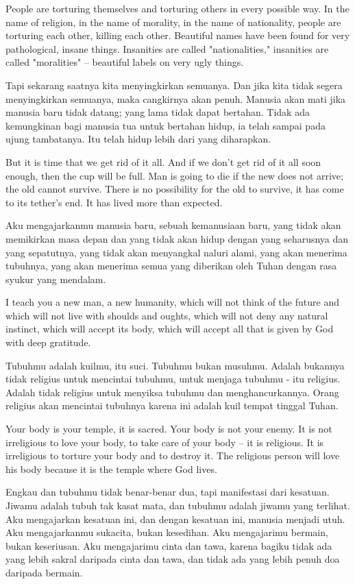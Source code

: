 \english
People are torturing themselves and torturing others in every possible way. In the name of religion, in the name of morality, in the name of nationality, people are torturing each other, killing each other. Beautiful names have been found for very pathological, insane things. Insanities are called "nationalities," insanities are called "moralities" -- beautiful labels on very ugly things.

\bahasa
Tapi sekarang saatnya kita menyingkirkan semuanya. Dan jika kita tidak segera menyingkirkan semuanya, maka cangkirnya akan penuh. Manusia akan mati jika manusia baru tidak datang; yang lama tidak dapat bertahan. Tidak ada kemungkinan bagi manusia tua untuk bertahan hidup, ia telah sampai pada ujung tambatanya. Itu telah hidup lebih dari yang diharapkan.

\english
But it is time that we get rid of it all. And if we don't get rid of it all soon enough, then the cup will be full. Man is going to die if the new does not arrive; the old cannot survive. There is no possibility for the old to survive, it has come to its tether's end. It has lived more than expected.

\bahasa
Aku mengajarkanmu manusia baru, sebuah kemanusiaan baru, yang tidak akan memikirkan masa depan dan yang tidak akan hidup dengan yang seharusnya dan yang sepatutnya, yang tidak akan menyangkal naluri alami, yang akan menerima tubuhnya, yang akan menerima semua yang diberikan oleh Tuhan dengan rasa syukur yang mendalam.

\english
I teach you a new man, a new humanity, which will not think of the future and which will not live with shoulds and oughts, which will not deny any natural instinct, which will accept its body, which will accept all that is given by God with deep gratitude.

\bahasa
Tubuhmu adalah kuilmu, itu suci. Tubuhmu bukan musuhmu. Adalah bukannya tidak religius untuk mencintai tubuhmu, untuk menjaga tubuhmu - itu religius. Adalah tidak religius untuk menyiksa tubuhmu dan menghancurkannya. Orang religius akan mencintai tubuhnya karena ini adalah kuil tempat tinggal Tuhan.

\english
Your body is your temple, it is sacred. Your body is not your enemy. It is not irreligious to love your body, to take care of your body -- it is religious. It is irreligious to torture your body and to destroy it. The religious person will love his body because it is the temple where God lives.

\bahasa
Engkau dan tubuhmu tidak benar-benar dua, tapi manifestasi dari kesatuan. Jiwamu adalah tubuh tak kasat mata, dan tubuhmu adalah jiwamu yang terlihat. Aku mengajarkan kesatuan ini, dan dengan kesatuan ini, manusia menjadi utuh. Aku mengajarkanmu sukacita, bukan kesedihan. Aku mengajarimu bermain, bukan keseriusan. Aku mengajarimu cinta dan tawa, karena bagiku tidak ada yang lebih sakral daripada cinta dan tawa, dan tidak ada yang lebih penuh doa daripada bermain.

